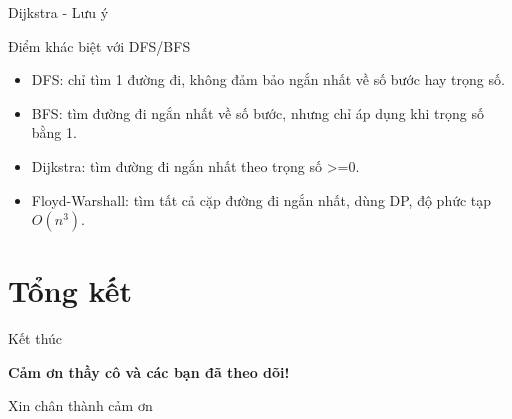 \documentclass{beamer}
\begin{document}
\begin{frame}{Dijkstra - Lưu ý}
    \begin{exampleblock}{Điểm khác biệt với DFS/BFS}
        \begin{itemize}
            \item[$\rightarrow$] DFS: chỉ tìm 1 đường đi, không đảm bảo ngắn nhất về số bước hay trọng số.
            \item[$\rightarrow$] BFS: tìm đường đi ngắn nhất về số bước, nhưng chỉ áp dụng khi trọng số bằng 1.
            \item[$\rightarrow$] Dijkstra: tìm đường đi ngắn nhất theo trọng số >=0.
            \item[$\rightarrow$] Floyd-Warshall: tìm tất cả cặp đường đi ngắn nhất, dùng DP, độ phức tạp \(O(n^3)\).
        \end{itemize}
    \end{exampleblock}
\end{frame}



\section{Tổng kết}

\begin{frame}{Kết thúc}
    \centering
    \vspace{0.8cm}

    {\Huge \textbf{Cảm ơn thầy cô và các bạn đã theo dõi!}}

    \vspace{1cm}
    {\Large Xin chân thành cảm ơn}

    \vspace{1.2cm}

    \vfill

\end{frame}
\end{document}
